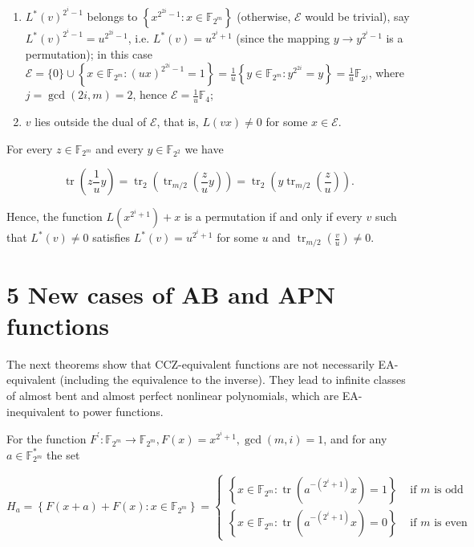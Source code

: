 \documentclass[10pt]{article}
\begin{document}
\begin{enumerate}
  \item $L^{*}(v)^{2^{i}-1}$ belongs to $\left\{x^{2^{2 i}-1}: x \in \mathbb{F}_{2^{m}}\right\}$ (otherwise, $\mathcal{E}$ would be trivial), say $L^{*}(v)^{2^{i}-1}= u^{2^{2 i}-1}$, i.e. $L^{*}(v)=u^{2^{i}+1}$ (since the mapping $y \rightarrow y^{2^{i}-1}$ is a permutation); in this case $\mathcal{E}= \{0\} \cup\left\{x \in \mathbb{F}_{2^{m}}:(u x)^{2^{2 i}-1}=1\right\}=\frac{1}{u}\left\{y \in \mathbb{F}_{2^{m}}: y^{2^{2 i}}=y\right\}=\frac{1}{u} \mathbb{F}_{2^{j}}$, where $j=\operatorname{gcd}(2 i, m)=2$, hence $\mathcal{E}=\frac{1}{u} \mathbb{F}_{4}$;
  \item $v$ lies outside the dual of $\mathcal{E}$, that is, $L(v x) \neq 0$ for some $x \in \mathcal{E}$.
\end{enumerate}

For every $z \in \mathbb{F}_{2^{m}}$ and every $y \in \mathbb{F}_{2^{2}}$ we have

$$
\operatorname{tr}\left(z \frac{1}{u} y\right)=\operatorname{tr}_{2}\left(\operatorname{tr}_{m / 2}\left(\frac{z}{u} y\right)\right)=\operatorname{tr}_{2}\left(y \operatorname{tr}_{m / 2}\left(\frac{z}{u}\right)\right) .
$$

Hence, the function $L\left(x^{2^{i}+1}\right)+x$ is a permutation if and only if every $v$ such that $L^{*}(v) \neq 0$ satisfies $L^{*}(v)=u^{2^{i}+1}$ for some $u$ and $\operatorname{tr}_{m / 2}\left(\frac{v}{u}\right) \neq 0$.

\section*{5 New cases of AB and APN functions}
The next theorems show that CCZ-equivalent functions are not necessarily EA-equivalent (including the equivalence to the inverse). They lead to infinite classes of almost bent and almost perfect nonlinear polynomials, which are EA-inequivalent to power functions.

For the function $F^{\prime}: \mathbb{F}_{2^{m}} \rightarrow \mathbb{F}_{2^{m}}, F(x)=x^{2^{i}+1}, \operatorname{gcd}(m, i)=1$, and for any $a \in \mathbb{F}_{2^{m}}^{*}$ the set

$$
H_{a}=\left\{F(x+a)+F(x): x \in \mathbb{F}_{2^{m}}\right\}= \begin{cases}\left\{x \in \mathbb{F}_{2^{m}}: \operatorname{tr}\left(a^{-\left(2^{i}+1\right)} x\right)=1\right\} & \text { if } m \text { is odd } \\ \left\{x \in \mathbb{F}_{2^{m}}: \operatorname{tr}\left(a^{-\left(2^{i}+1\right)} x\right)=0\right\} & \text { if } m \text { is even }\end{cases}
$$
\end{document}
